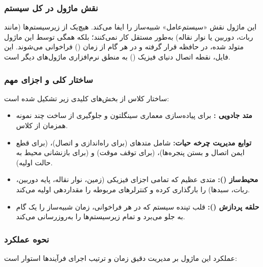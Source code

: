 \documentclass{article}
\begin{document}
\subsubsection{نقش ماژول در کل سیستم}
این ماژول نقش «سیستم‌عامل» شبیه‌ساز را ایفا می‌کند. هیچ‌یک از زیرسیستم‌ها (مانند ربات، دوربین یا نوار نقاله) به‌طور مستقل کار نمی‌کنند؛ بلکه همگی توسط این ماژول متولد شده، در حافظه قرار گرفته و در هر گام از زمان () فراخوانی می‌شوند. این فایل، نقطه اتصال دنیای فیزیک () به منطق نرم‌افزاری ماژول‌های دیگر است.

\subsubsection{ساختار کلی و اجزای مهم}
ساختار کلاس  از بخش‌های کلیدی زیر تشکیل شده است:

\begin{itemize}
	\item \textbf{متد جادویی :} برای پیاده‌سازی معماری سینگلتون و جلوگیری از ساخت چند نمونه همزمان از کلاس.
	\item \textbf{توابع مدیریت چرخه حیات:} شامل متدهای  (برای راه‌اندازی و اتصال)،  (برای قطع ایمن اتصال و بستن پنجره‌ها)،  (برای توقف موقت) و  (برای بازنشانی محیط به حالت اولیه).
	\item \textbf{محیط‌ساز ():} متدی عظیم که تمامی اجزای فیزیکی (زمین، نوار نقاله، پایه دوربین، ربات، سبدها) را بارگذاری کرده و کنترلرهای مربوطه را مقداردهی اولیه می‌کند.
	\item \textbf{حلقه پردازش ():} قلب تپنده سیستم که در هر فراخوانی، زمان شبیه‌ساز را یک گام به جلو می‌برد و تمام زیرسیستم‌ها را به‌روزرسانی می‌کند.
\end{itemize}

\subsubsection{نحوه عملکرد}
عملکرد این ماژول بر مدیریت دقیق زمان و ترتیب اجرای فرآیندها استوار است:
\end{document}
